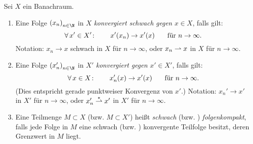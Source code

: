 \begin{thDef}
    Sei $X$ ein Banachraum.
    \begin{enumerate}[1.]
        \item 
            Eine Folge $\nSeq x$ in $X$ \emph{konvergiert schwach gegen
            $x\in X$}, falls gilt:
            \[ \forall\,x'\in X'\colon\qquad
                x'(x_n) \to x'(x) \!\fuer n\to\infty  
            . \]
            Notation: $x_n\to x$ schwach in $X$ für $n\to\infty$, oder
            $x_n \weakto x$ in $X$ für $n\to\infty$.
            
        \item
            Eine Folge $\nSeq{x'}$ in $X'$ \emph{konvergiert \schwachstern 
            gegen $x'\in X'$}, falls gilt:
            \[ \forall\,x\in X\colon\qquad
                x_n'(x) \to x'(x) \!\fuer n\to\infty  
            . \]
            (Dies entspricht gerade punktweiser Konvergenz von $x'$.) Notation:
            $x_n' \to x'$ \schwachstern in $X'$ für $n\to\infty$, oder
            $x_n' \weakstarto x'$ in $X'$ für $n\to\infty$.
            
        \item
            Eine Teilmenge $M\subset X$ (bzw. $M\subset X'$) heißt
            \emph{schwach} (bzw. \emph{\schwachstern[]}) \emph{folgenkompakt}, falls
            jede Folge in $M$ eine schwach (bzw. \schwachstern[]) konvergente
            Teilfolge besitzt, deren Grenzwert in $M$ liegt.
    \end{enumerate}
\end{thDef}

